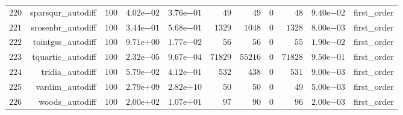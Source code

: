 \documentclass[varwidth=20cm,crop=true]{standalone}
\begin{document}
\begin{longtable}{rrrrrrrrrrr}
  \(   220\) & sparsqur\_autodiff & \(   100\) & \( 4.02\)e\(-02\) & \( 3.76\)e\(-01\) & \(    49\) & \(    49\) & \(     0\) & \(    48\) & \( 9.40\)e\(-02\) & first\_order \\
  \(   221\) & srosenbr\_autodiff & \(   100\) & \( 3.44\)e\(-01\) & \( 5.68\)e\(-01\) & \(  1329\) & \(  1048\) & \(     0\) & \(  1328\) & \( 8.00\)e\(-03\) & first\_order \\
  \(   222\) & tointgss\_autodiff & \(   100\) & \( 9.71\)e\(+00\) & \( 1.77\)e\(-02\) & \(    56\) & \(    56\) & \(     0\) & \(    55\) & \( 1.90\)e\(-02\) & first\_order \\
  \(   223\) & tquartic\_autodiff & \(   100\) & \( 2.32\)e\(-05\) & \( 9.67\)e\(-04\) & \( 71829\) & \( 55216\) & \(     0\) & \( 71828\) & \( 9.50\)e\(-01\) & first\_order \\
  \(   224\) & tridia\_autodiff & \(   100\) & \( 5.79\)e\(-02\) & \( 4.12\)e\(-01\) & \(   532\) & \(   438\) & \(     0\) & \(   531\) & \( 9.00\)e\(-03\) & first\_order \\
  \(   225\) & vardim\_autodiff & \(   100\) & \( 2.79\)e\(+09\) & \( 2.82\)e\(+10\) & \(    50\) & \(    50\) & \(     0\) & \(    49\) & \( 5.00\)e\(-03\) & first\_order \\
  \(   226\) & woods\_autodiff & \(   100\) & \( 2.00\)e\(+02\) & \( 1.07\)e\(+01\) & \(    97\) & \(    90\) & \(     0\) & \(    96\) & \( 2.00\)e\(-03\) & first\_order \\\hline
\end{longtable}
\end{document}
